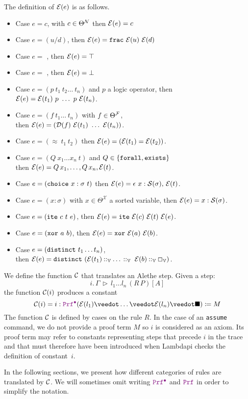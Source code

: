 \begin{definition}
The definition of $\E{e}$ is as follows.
\begin{itemize}
\setlength{\parskip}{0pt}
\item Case $e = c$, with $c \in \Theta^\cal{N}$ then $\E{e} = c$
\item Case $e = (u \slash d)$, then $\E{e} = \kw{frac}~\E{u}~\E{d}$
\item Case $e =$ , then $\E{e} = \top$
\item Case $e =$ , then $\E{e} = \bot$
\item Case $e = (p~t_1~t_2\dots~t_n)$ and $p$ a logic operator, then $\E{e} = \E{t_1}~p~\dots~p~\E{t_n}$.
\item Case $e = (f~t_1\dots~t_n)$ with $f \in \Theta^\cal{F}$,\\
  then $\E{e} = (\mathcal{D}(f)~\E{t_1}~\dots~\E{t_n})$.
\item Case $e = (\approx~t_1~t_2)$ then $\E{e} = (\E{t_1} = \E{t_2})$.
\item Case $e = (Q~x_1  \dots x_n ~t)$ and $Q\in \{\kw{forall}, \kw{exists}\}$\\
  then $\E{e} = Q\,x_1, \dots, Q\,x_n, \E{t}$.
\item Case $e = (\kw{choice}~x : \sigma ~t)$ then $\E{e} = \epsilon~x: \cal{S}(\sigma),\, \E{t}$.
\item Case $e = (x: \sigma )$ with $x \in \Theta^\mathcal{X}$ a sorted variable, then $\E{e} = x: \cal{S}(\sigma)$.
\item Case $e = (\kw{ite}~c~t~e)$, then $\E{e} = \kw{ite}~\E{c}~\E{t}~\E{e}$.
\item Case $e = (\kw{xor}~a~b)$, then $\E{e} = \kw{xor}~\E{a}~\E{b}$.
\item Case $e = (\kw{distinct}~t_1 \dots t_n)$,\\
  then $\E{e} = \kw{distinct}~(\E{t_1} \mathbin{\cons_\bb{V}} \dots\, \mathbin{\cons_\bb{V}} ~\E{b} \mathbin{\cons_\bb{V}} \Box_\bb{V})$.
\end{itemize}
\label{def:function-e}
\end{definition}


\begin{definition}
We define the function $\cal{C}$ that translates an Alethe step. Given a step:
\[
  i. \, \Gamma \, \triangleright\, l_1 \dots l_n\,(R\,P)[A]
\]
the function $\cal{C}(i)$ produces a constant
\[
  \cal{C}(i) = i: \pid (\E{l_1}\veedot\dots\veedot\E{l_n}\veedot \nil) \coloneq M
\]
The function $\cal{C}$ is defined by cases on the rule $R$.
In the case of an \texttt{assume} command, we do not provide a proof term $M$ so $i$ is considered as an axiom.
Its proof term may refer to constants representing steps that precede $i$ in the trace and that must therefore have been introduced when Lambdapi checks the definition of constant~$i$.
\label{def:function-c}
\end{definition}

In the following sections, we present how different categories of rules are translated by $\cal{C}$.
We will sometimes omit writing $\pid$ and $\prf$ in order to simplify the notation.